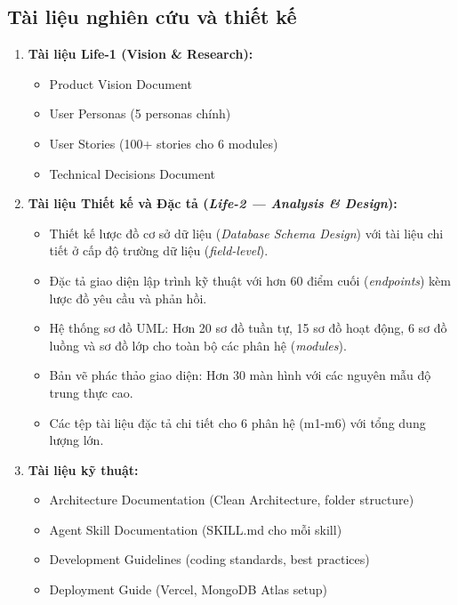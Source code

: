 \documentclass[13pt,a4paper,oneside]{extreport}
\numberwithin{equation}{chapter}
\numberwithin{figure}{chapter}
\numberwithin{table}{chapter}
\begin{document}
\subsection*{Tài liệu nghiên cứu và thiết kế}

\begin{enumerate}
    \item \textbf{Tài liệu Life-1 (Vision \& Research):}
    \begin{itemize}
        \item Product Vision Document
        \item User Personas (5 personas chính)
        \item User Stories (100+ stories cho 6 modules)
        \item Technical Decisions Document
    \end{itemize}

    \item \textbf{Tài liệu Thiết kế và Đặc tả (\textit{Life-2 — Analysis \& Design}):}
    \begin{itemize}
        \item Thiết kế lược đồ cơ sở dữ liệu (\textit{Database Schema Design}) với tài liệu chi tiết ở cấp độ trường dữ liệu (\textit{field-level}).
        \item Đặc tả giao diện lập trình kỹ thuật với hơn 60 điểm cuối (\textit{endpoints}) kèm lược đồ yêu cầu và phản hồi.
        \item Hệ thống sơ đồ UML: Hơn 20 sơ đồ tuần tự, 15 sơ đồ hoạt động, 6 sơ đồ luồng và sơ đồ lớp cho toàn bộ các phân hệ (\textit{modules}).
        \item Bản vẽ phác thảo giao diện: Hơn 30 màn hình với các nguyên mẫu độ trung thực cao.
        \item Các tệp tài liệu đặc tả chi tiết cho 6 phân hệ (m1-m6) với tổng dung lượng lớn.
    \end{itemize}

    \item \textbf{Tài liệu kỹ thuật:}
    \begin{itemize}
        \item Architecture Documentation (Clean Architecture, folder structure)
        \item Agent Skill Documentation (SKILL.md cho mỗi skill)
        \item Development Guidelines (coding standards, best practices)
        \item Deployment Guide (Vercel, MongoDB Atlas setup)
    \end{itemize}
\end{enumerate}
\end{document}
